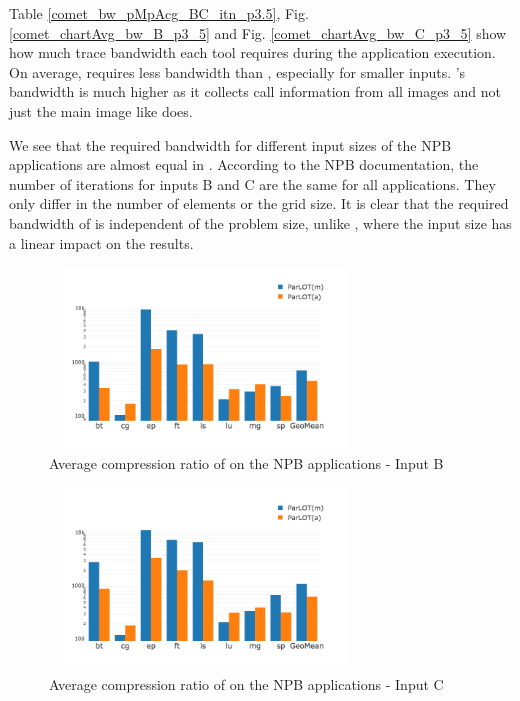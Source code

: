 Table \ref{comet_bw_pMpAcg_BC_itn_p3.5}, Fig.  \ref{comet_chartAvg_bw_B_p3_5} and Fig. \ref{comet_chartAvg_bw_C_p3_5} show how much trace bandwidth each tool
requires
during the application execution.
%
On average, \parlotm requires less bandwidth than
\callgrind, especially for smaller inputs.
%
\parlota's bandwidth is much higher as it collects call information from all
images and not just the main image like \parlotm does.

We see that the required bandwidth for different input sizes of the NPB applications are almost equal in \parlot. According to the NPB documentation, the number of iterations for inputs B and C are the same for all applications. They only differ in the number of elements or the grid size. It is clear that the required bandwidth of \parlot is independent of the problem size, unlike \callgrind, where the input size has a linear impact on the results.

%
\begin{figure}[t]
\centering
\includegraphics[width=3.2in,height=1.9in]{parlot/figs.comet.newMed/comet_chartAvg_cr_B_p3_5.png}
\caption{ Average compression ratio of \parlot on the NPB applications - Input B}
\label{comet_chartAvg_cr_B_p3_5}
\end{figure}

\begin{figure}[t]
\centering
\includegraphics[width=3.2in,height=1.9in]{parlot/figs.comet.newMed/comet_chartAvg_cr_C_p3_5.png}
\caption{ Average compression ratio of \parlot on the NPB applications - Input C}
\label{comet_chartAvg_cr_C_p3_5}
\end{figure}



